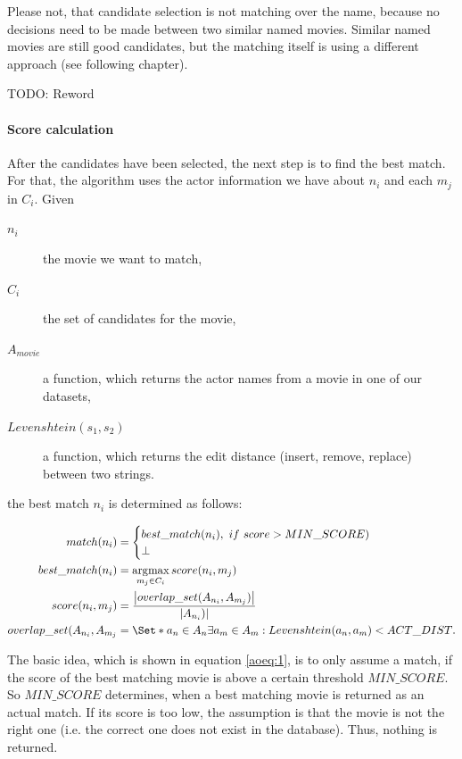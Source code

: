 Please not, that candidate selection is not matching over the name, because no decisions need to be made between two similar named movies.
Similar named movies are still good candidates, but the matching itself is using a different approach (see following chapter).

TODO: Reword

\paragraph{Score calculation}
After the candidates have been selected, the next step is to find the best match.
For that, the algorithm uses the actor information we have about $n_i$ and each $m_j$ in $C_i$.
Given
\begin{description}
	\item[$n_i$] the movie we want to match,
	\item[$C_i$] the set of candidates for the movie,
	\item[$A_{movie}$] a function, which returns the actor names from a movie in one of our datasets,
	\item[$Levenshtein(s_1, s_2)$] a function, which returns the edit distance (insert, remove, replace) between two strings.
\end{description}
the best match $n_i$ is determined as follows:

\begin{align}
	match(n_i) &=
		\begin{cases}
			best\_match(n_i),~if~score > MIN\_SCORE) \\
			\bot
		\end{cases}\label{aoeq:1}\\
	best\_match(n_i) &=
		\argmax_{m_j \in C_i} score(n_i, m_j)\label{aoeq:2}\\
	score(n_i, m_j) &=
		\frac
			{\left\lvert overlap\_set(A_{n_i}, A_{m_j}) \right\rvert}
			{\left\lvert A_{n_i}) \right\rvert}\label{aoeq:3}\\
	overlap\_set(A_{n_i}, A_{m_j} &=
		\Set*{a_n \in A_n}{\exists a_m \in A_m: Levenshtein(a_n, a_m) < ACT\_DIST}.\label{aoeq:4}
\end{align}

The basic idea, which is shown in equation \ref{aoeq:1}, is to only assume a match, if the score of the best matching movie is above a certain threshold $MIN\_SCORE$.
So $MIN\_SCORE$ determines, when a best matching movie is returned as an actual match.
If its score is too low, the assumption is that the movie is not the right one (i.e. the correct one does not exist in the database).
Thus, nothing is returned.

